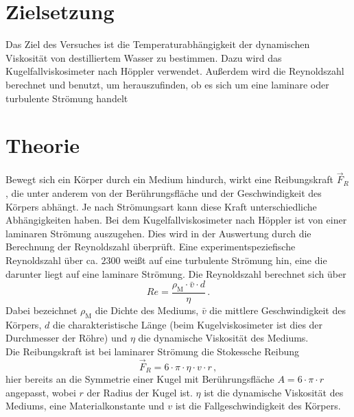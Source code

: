 \section{Zielsetzung}
\label{sec:Zielsetzung}
Das Ziel des Versuches ist die Temperaturabhängigkeit der dynamischen 
Viskosität von destilliertem Wasser zu bestimmen. Dazu wird das 
Kugelfallviskosimeter nach Höppler verwendet. Außerdem wird die Reynoldszahl 
berechnet und benutzt, um herauszufinden, ob es sich um eine laminare oder
turbulente Strömung handelt
%
%
%
\section{Theorie}
    \label{sec:Theorie}
    Bewegt sich ein Körper durch ein Medium hindurch, wirkt eine Reibungskraft 
    $\vec{F}_{R}$, die unter anderem von der Berührungsfläche und der Geschwindigkeit
    des Körpers abhängt. Je nach Strömungsart kann diese Kraft 
    unterschiedliche Abhängigkeiten haben. Bei dem Kugelfallviskosimeter nach 
    Höppler ist von einer laminaren Strömung auszugehen. 
    Dies wird in der Auswertung durch die
    Berechnung der Reynoldszahl überprüft. Eine experimentspeziefische 
    Reynoldszahl über ca. $2300$ weißt auf eine turbulente Strömung hin, eine die
    darunter liegt auf eine laminare Strömung. Die Reynoldszahl berechnet sich
    über 
    \begin{equation}
        Re = \frac{\rho_{\text{M}} \cdot \bar{v} \cdot d}{\eta}\,. 
        \label{eqn:Reynoldszahl}
    \end{equation}
    Dabei bezeichnet $\rho_{\text{M}}$ die Dichte des Mediums, $\bar{v}$
    die mittlere Geschwindigkeit des Körpers, $d$ die charakteristische 
    Länge (beim Kugelviskosimeter ist dies der Durchmesser der Röhre)
    und $\eta$ die dynamische Viskosität des Mediums. \\
    Die Reibungskraft ist bei laminarer Strömung die Stokessche Reibung
    \begin{equation}
        \vec{F}_{R} = 6 \cdot \pi \cdot \eta \cdot v \cdot r \, , 
        \label{eqn:Stokesreibungskraft}
    \end{equation}
    hier bereits an die Symmetrie einer Kugel mit Berührungsfläche 
    $A = 6 \cdot \pi \cdot r$ angepasst, wobei $r$ der Radius der Kugel ist. 
    $\eta$ ist die dynamische Viskosität des Mediums, eine Materialkonstante und
    $v$ ist die Fallgeschwindigkeit des Körpers. \\
%
%
%
